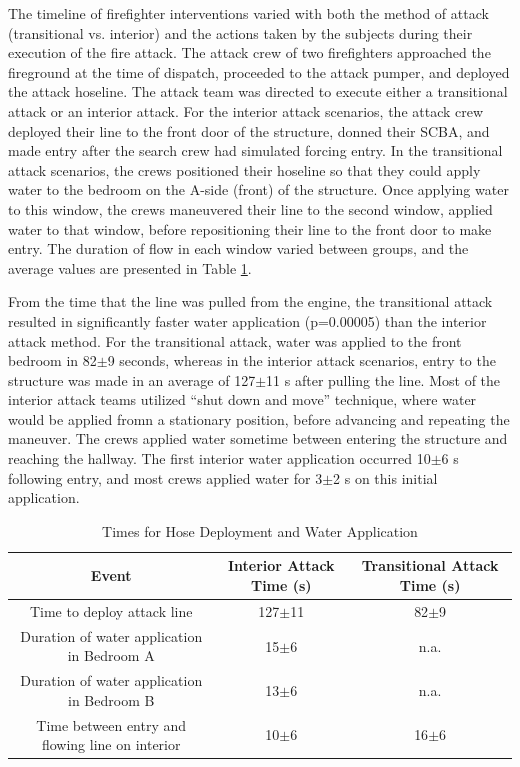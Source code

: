 \documentclass[12pt,oneside]{article}
\begin{document}
The timeline of firefighter interventions varied with both the method of attack (transitional vs. interior) and the actions taken by the subjects during their execution of the fire attack. The attack crew of two firefighters approached the fireground at the time of dispatch, proceeded to the attack pumper, and deployed the attack hoseline. The attack team was directed to execute either a transitional attack or an interior attack. For the interior attack scenarios, the attack crew deployed their line to the front door of the structure, donned their SCBA, and made entry after the search crew had simulated forcing entry. In  the transitional attack scenarios, the crews positioned their hoseline so that they could apply water to the bedroom on the A-side (front) of the structure. Once applying water to this window, the crews maneuvered their line to the second window, applied water to that window, before repositioning their line to the front door to make entry. The duration of flow in each window varied between groups, and the average values are presented in Table \ref{tab:suppression_times}. 

From the time that the line was pulled from the engine, the transitional attack resulted in significantly faster water application (p=0.00005) than the interior attack method. For the transitional attack, water was applied to the front bedroom in 82$\pm$9 seconds, whereas in the interior attack scenarios, entry to the structure was made in an average of 127$\pm$11 s after pulling the line. Most of the interior attack teams utilized ``shut down and move'' technique, where water would be applied fromn a stationary position, before advancing and repeating the maneuver. The crews applied water sometime between entering the structure and reaching the hallway. The first interior water application occurred 10$\pm$6 s following entry, and most crews applied water for 3$\pm$2 s on this initial application. 

\begin{table}[!ht]
    \centering
    \caption{Times for Hose Deployment and Water Application}
    \label{tab:suppression_times}
    \begin{tabular}{ccc}
    \toprule[1.5pt]
 	 Event&								Interior Attack Time (s)&	Transitional Attack Time (s)\\
 	\midrule 
 	Time to deploy attack line 						& 127$\pm$11	& 82$\pm$9					\\
 	Duration of water application in Bedroom A 		& 15$\pm$6		& n.a.							\\
 	Duration of water application in Bedroom B 		& 13$\pm$6		& n.a.							\\
 	Time between entry and flowing line on interior & 10$\pm$6  	& 16$\pm$6						\\
 	\bottomrule[1.25pt] 
    \end{tabular}
\end{table}
\end{document}
